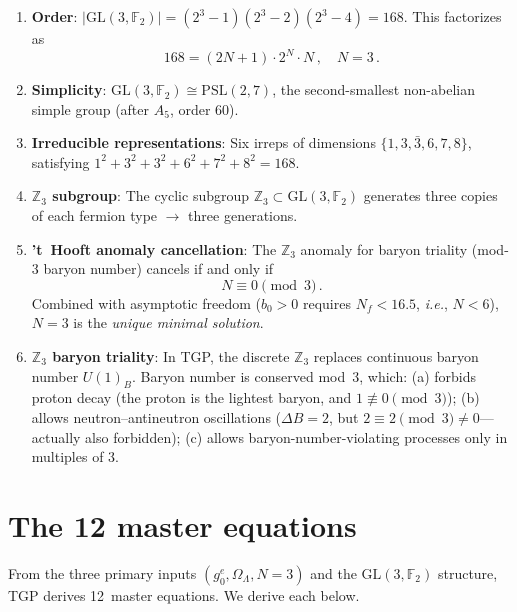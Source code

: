 \documentclass[aps,prd,twocolumn,superscriptaddress,showpacs,
  nofootinbib,floatfix,longbibliography]{revtex4-2}
\newcommand{\gone}{{g_0^e}}
\newcommand{\OL}{\Omega_\Lambda}
\newcommand{\GL}{\mathrm{GL}(3,\mathbb{F}_2)}
\newcommand{\ZZ}{\mathbb{Z}}
\newcommand{\ie}{\textit{i.e.}}
\begin{document}
\begin{enumerate}
\item \textbf{Order}:
  $|\GL| = (2^3 - 1)(2^3 - 2)(2^3 - 4) = 168$.
  This factorizes as
  \begin{equation}\label{eq:168}
    168 = (2N{+}1) \cdot 2^N \cdot N\,,\quad N = 3\,.
  \end{equation}

\item \textbf{Simplicity}:
  $\GL \cong \mathrm{PSL}(2,7)$, the second-smallest non-abelian
  simple group (after $A_5$, order 60).

\item \textbf{Irreducible representations}:
  Six irreps of dimensions $\{1, 3, \bar{3}, 6, 7, 8\}$,
  satisfying $1^2 + 3^2 + 3^2 + 6^2 + 7^2 + 8^2 = 168$.

\item \textbf{$\ZZ_3$ subgroup}:
  The cyclic subgroup $\ZZ_3 \subset \GL$ generates three copies of each
  fermion type $\to$ three generations.

\item \textbf{'t~Hooft anomaly cancellation}:
  The $\ZZ_3$ anomaly for baryon triality (mod-3 baryon number) cancels
  if and only if
  \begin{equation}\label{eq:anomaly-N}
    N \equiv 0 \pmod{3}\,.
  \end{equation}
  Combined with asymptotic freedom ($b_0 > 0$ requires $N_f < 16.5$,
  \ie, $N < 6$), $N = 3$ is the \emph{unique minimal solution}.

\item \textbf{$\ZZ_3$ baryon triality}:
  In TGP, the discrete $\ZZ_3$ replaces continuous baryon number $U(1)_B$.
  Baryon number is conserved mod~3, which:
  (a) forbids proton decay (the proton is the lightest baryon, and
  $1 \not\equiv 0 \pmod{3}$);
  (b) allows neutron--antineutron oscillations ($\Delta B = 2$,
  but $2 \equiv 2 \pmod{3} \neq 0$---actually also forbidden);
  (c) allows baryon-number-violating processes only in multiples of 3.
\end{enumerate}


\section{The 12 master equations}\label{sec:master}

From the three primary inputs $(\gone, \OL, N{=}3)$ and the $\GL$ structure,
TGP derives 12~master equations. We derive each below.
\end{document}

